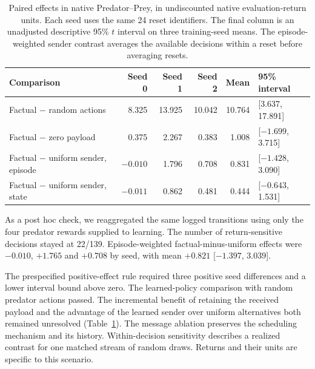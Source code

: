 \documentclass[pdflatex,sn-mathphys-num]{sn-jnl}
\begin{document}
\begin{table}[htbp]\centering
\caption{Paired effects in native Predator--Prey, in undiscounted native evaluation-return units. Each seed uses the same 24 reset identifiers. The final column is an unadjusted descriptive 95\% $t$ interval on three training-seed means. The episode-weighted sender contrast averages the available decisions within a reset before averaging resets.}\label{tab:external-native-sender}
\begin{tabular}{@{}lrrrrl@{}}\toprule
Comparison & Seed 0 & Seed 1 & Seed 2 & Mean & 95\% interval\\\midrule
Factual $-$ random actions & 8.325 & 13.925 & 10.042 & 10.764 & [3.637, 17.891]\\
Factual $-$ zero payload & 0.375 & 2.267 & 0.383 & 1.008 & [$-1.699$, 3.715]\\
Factual $-$ uniform sender, episode & $-0.010$ & 1.796 & 0.708 & 0.831 & [$-1.428$, 3.090]\\
Factual $-$ uniform sender, state & $-0.011$ & 0.862 & 0.481 & 0.444 & [$-0.643$, 1.531]\\
\bottomrule\end{tabular}
\end{table}

As a post hoc check, we reaggregated the same logged transitions using only the four predator rewards supplied to learning. The number of return-sensitive decisions stayed at 22/139. Episode-weighted factual-minus-uniform effects were $-0.010$, $+1.765$ and $+0.708$ by seed, with mean $+0.821$ [$-1.397$, $3.039$].

The prespecified positive-effect rule required three positive seed differences and a lower interval bound above zero. The learned-policy comparison with random predator actions passed. The incremental benefit of retaining the received payload and the advantage of the learned sender over uniform alternatives both remained unresolved (Table~\ref{tab:external-native-sender}). The message ablation preserves the scheduling mechanism and its history. Within-decision sensitivity describes a realized contrast for one matched stream of random draws. Returns and their units are specific to this scenario.

\FloatBarrier

\end{document}
